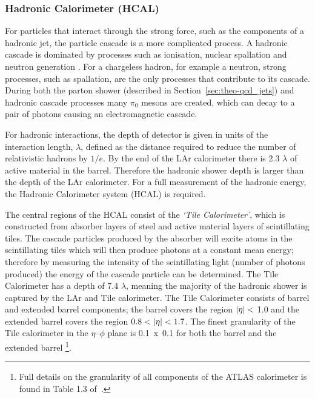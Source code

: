 \subsubsection{Hadronic Calorimeter (HCAL)}
\label{sec:det-calo_HCAL}

For particles that interact through the strong force, such as the components of a hadronic jet,
the particle cascade is a more complicated process.
A hadronic cascade is dominated by processes such as
ionisation, nuclear spallation and neutron generation \cite{det-thesis_kate,det-nuclearInt_book}.
For a chargeless hadron, for example a neutron,
strong processes, such as spallation, are the only processes that contribute to its cascade.
During both the parton shower (described in Section~\ref{sec:theo-qcd_jets}) and hadronic cascade processes many $\pi_0$ mesons are created,
which can decay to a pair of photons causing an electromagnetic cascade. 

For hadronic interactions, the depth of detector is given in units of the interaction length, $\lambda$,
defined as the distance required to reduce the number of relativistic hadrons by $1/e$.
By the end of the LAr calorimeter there is 2.3 $\lambda$ of active material in the barrel.
Therefore the hadronic shower depth is larger than the depth of the LAr calorimeter.
For a full measurement of the hadronic energy, the Hadronic Calorimeter system (HCAL) is required. 

The central regions of the HCAL consist of the \textit{`Tile Calorimeter'},
which is constructed from absorber layers of steel and active material layers of scintillating tiles.
The cascade particles produced by the absorber will excite atoms in the scintillating tiles which will then produce photons at a constant mean energy;
therefore by measuring the intensity of the scintillating light (number of photons produced) the energy of the cascade particle can be determined.
The Tile Calorimeter has a depth of 7.4 $\lambda$, meaning the majority of the hadronic shower is captured by the LAr and Tile calorimeter.
The Tile Calorimeter consists of barrel and extended barrel components;
the barrel covers the region $|\eta|\nobreak<$ 1.0 and the extended barrel covers the region $0.8\nobreak<\nobreak|\eta|\nobreak<\nobreak1.7$.
The finest granularity of the Tile calorimeter in the $\eta$--$\phi$ plane
is 0.1~x~0.1 for both the barrel and the extended barrel \footnote{Full details on the granularity of all components of the ATLAS calorimeter is found in Table 1.3 of~\cite{det-ATLAS_Exp}.}. 

